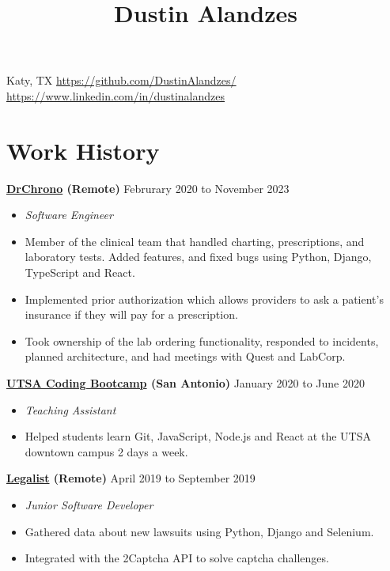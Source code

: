 \documentclass[10pt]{article}
\title{Dustin Alandzes}
\author{}
\date{}
\begin{document}
   \pagestyle{empty}
   \maketitle
   \thispagestyle{empty}

   \begin{center}
    Katy, TX \break
    \href{https://github.com/DustinAlandzes/}{https://github.com/DustinAlandzes/}
    \href{https://www.linkedin.com/in/dustinalandzes}{https://www.linkedin.com/in/dustinalandzes}
   \end{center}

   \section*{Work History}
   \textbf{\href{https://www.drchrono.com/}{DrChrono} (Remote)} \hfill {Februrary 2020 to November 2023}
   \begin{itemize}
     \item[] \textit{Software Engineer}
     \item[] Member of the clinical team that handled charting, prescriptions, and laboratory tests.
     Added features, and fixed bugs using Python, Django, TypeScript and React.
     \item[] Implemented prior authorization which allows providers to ask a patient's insurance if they will pay for a prescription.
     \item[] Took ownership of the lab ordering functionality, responded to incidents, planned architecture, and had meetings with Quest and LabCorp.
    \end{itemize}

   \textbf{\href{https://bootcamp.utsa.edu/coding/}{UTSA Coding Bootcamp} (San Antonio)} \hfill {January 2020 to June 2020}
    \begin{itemize}
     \item[] \textit{Teaching Assistant}
     \item[] Helped students learn Git, JavaScript, Node.js and React at the UTSA downtown campus 2 days a week.
    \end{itemize}

     \textbf{\href{https://www.legalist.com/}{Legalist} (Remote)} \hfill {April 2019 to September 2019}
    \begin{itemize}
     \item[] \textit{Junior Software Developer}
     \item[] Gathered data about new lawsuits using Python, Django and Selenium.
     \item[] Integrated with the 2Captcha API to solve captcha challenges.
    \end{itemize}
\end{document}

